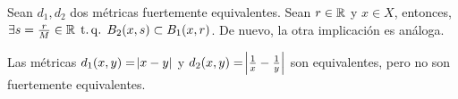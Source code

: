 \begin{ej}
	Sean $d_1, d_2$ dos m\'etricas fuertemente equivalentes. Sean $r \in \mathbb{R}$ y $x \in X$, entonces, $\exists s = \frac{r}{M} \in \mathbb{R} \operatorname{\;t.q.\;} B_2(x, s) \subset B_1(x, r)$.
	De nuevo, la otra implicación es análoga.

	Las m\'etricas $d_1(x,y) = \abs{x-y}$ y $d_2(x,y) = \abs{\frac{1}{x} - \frac{1}{y}}$ son equivalentes, pero no son fuertemente equivalentes.
\end{ej}
